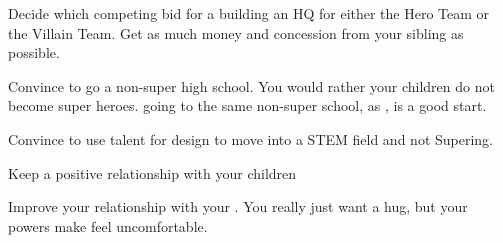 \documentclass[char]{LRSguildcamp1}
\begin{document}
\begin{itemz}[Goals]
	\item Decide which competing bid for a building an HQ for either the Hero Team or the Villain Team. Get as much money and concession from your sibling as possible.
	
	\item Convince \cTween{} to go a non-super high school. You would rather your children do not become super heroes. \cTween{} going to the same non-super school, \pNormalSchool{} as \cTeen{}, is a good start. 
	
	\item Convince \cTeen{} to use \cTeen{\their} talent for design to move into a STEM field and not Supering.
	
	\item Keep a positive relationship with your children
	
	\item Improve your relationship with your \cGrandma{\parent}. You really just want a hug, but your powers make \cGrandma{\them} feel uncomfortable.
	\end{itemz}

\begin{itemz}[Notes]
	\item 
\end{itemz}
\end{document}
